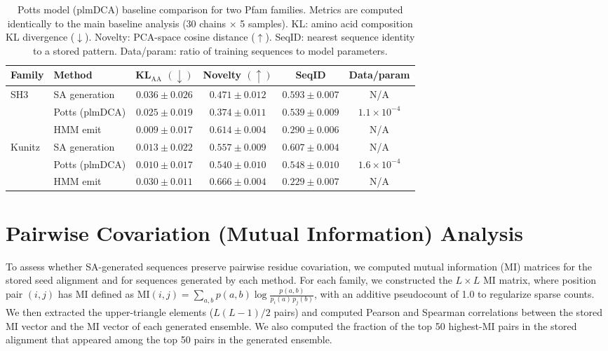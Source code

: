 \begin{table}[ht]
\centering
\caption{Potts model (plmDCA) baseline comparison for two Pfam families. Metrics are computed identically to the main baseline analysis (30 chains $\times$ 5 samples). KL: amino acid composition KL divergence ($\downarrow$). Novelty: PCA-space cosine distance ($\uparrow$). SeqID: nearest sequence identity to a stored pattern. Data/param: ratio of training sequences to model parameters.}
\label{tab:potts}
\small
\begin{tabular}{@{}llcccc@{}}
\toprule
Family & Method & KL$_{\mathrm{AA}}$ $(\downarrow)$ & Novelty $(\uparrow)$ & SeqID & Data/param \\
\midrule
\multirow{3}{*}{SH3}
 & SA generation & $0.036 \pm 0.026$ & $0.471 \pm 0.012$ & $0.593 \pm 0.007$ & N/A \\
 & Potts (plmDCA) & $0.025 \pm 0.019$ & $0.374 \pm 0.011$ & $0.539 \pm 0.009$ & $1.1 \times 10^{-4}$ \\
 & HMM emit & $0.009 \pm 0.017$ & $0.614 \pm 0.004$ & $0.290 \pm 0.006$ & N/A \\
\midrule
\multirow{3}{*}{Kunitz}
 & SA generation & $0.013 \pm 0.022$ & $0.557 \pm 0.009$ & $0.607 \pm 0.004$ & N/A \\
 & Potts (plmDCA) & $0.010 \pm 0.017$ & $0.540 \pm 0.010$ & $0.548 \pm 0.010$ & $1.6 \times 10^{-4}$ \\
 & HMM emit & $0.030 \pm 0.011$ & $0.666 \pm 0.004$ & $0.229 \pm 0.007$ & N/A \\
\bottomrule
\end{tabular}
\end{table}

\section{Pairwise Covariation (Mutual Information) Analysis}\label{si:covariation}

To assess whether SA-generated sequences preserve pairwise residue covariation, we computed mutual information (MI) matrices for the stored seed alignment and for sequences generated by each method. For each family, we constructed the $L \times L$ MI matrix, where position pair $(i, j)$ has MI defined as $\mathrm{MI}(i,j) = \sum_{a,b} p(a,b) \log\frac{p(a,b)}{p_i(a)\, p_j(b)}$, with an additive pseudocount of 1.0 to regularize sparse counts. We then extracted the upper-triangle elements ($L(L{-}1)/2$ pairs) and computed Pearson and Spearman correlations between the stored MI vector and the MI vector of each generated ensemble. We also computed the fraction of the top 50 highest-MI pairs in the stored alignment that appeared among the top 50 pairs in the generated ensemble.

